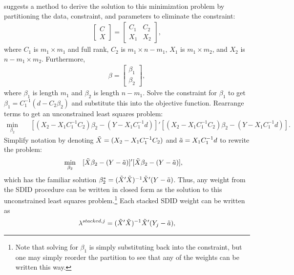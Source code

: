 \documentclass[12pt]{article}
\begin{document}
\cite{lawson1995} suggests a method to derive the solution to this minimization problem by partitioning the data, constraint, and parameters to eliminate the constraint:
\begin{align}
    \left[ \begin{array}{c}
        C \\
        X
    \end{array} \right] = 
    \left[ \begin{array}{cc}
        C_1 & C_2 \\
        X_1 & X_2
    \end{array} \right],
\end{align}
where \(C_1\) is \(m_1 \times m_1\) and full rank, \(C_2\) is \(m_1 \times n-m_1\), \(X_1\) is \(m_1 \times m_2\), and \(X_2\) is \(n-m_1 \times m_2\). Furthermore,
\begin{align}
    \beta = 
    \left[ \begin{array}{c}
        \beta_1 \\
        \beta_2
    \end{array} \right],
\end{align}
where \(\beta_1\) is length \(m_1\) and \(\beta_2\) is length \(n-m_1\).  Solve the constraint for \(\beta_1\) to get \(\beta_1 = C_1^{-1}(d-C_2\beta_2)\) and substitute this into the objective function.  Rearrange terms to get an unconstrained least squares problem:
\begin{align}
    \underset{\beta_2}{\min} & \quad [(X_2 - X_1C_1^{-1}C_2)\beta_2-(Y-X_1C_1^{-1}d)]'[(X_2 - X_1C_1^{-1}C_2)\beta_2-(Y-X_1C_1^{-1}d)].
\end{align}
Simplify notation by denoting \(\Tilde{X} = (X_2 - X_1C_1^{-1}C_2)\) and \(\Tilde{a} = X_1C_1^{-1}d\) to rewrite the problem:
\begin{align}
    \underset{\beta_2}{\min} & \quad [\Tilde{X}\beta_2-(Y-\Tilde{a})]'[\Tilde{X}\beta_2-(Y-\Tilde{a})],
\end{align}
which has the familiar solution \(\beta_2^* = (\Tilde{X}'\Tilde{X})^{-1}\Tilde{X}'(Y-\Tilde{a})\).  Thus, any weight from the SDID procedure can be written in closed form as the solution to this unconstrained least squares problem.\footnote{Note that solving for \(\beta_1\) is simply substituting back into the constraint, but one may simply reorder the partition to see that any of the weights can be written this way.}  Each stacked SDID weight can be written as
\begin{align}
    \lambda^{stacked,j} = (\Tilde{X}'\Tilde{X})^{-1}\Tilde{X}'(Y_j-\Tilde{a}),
\end{align}
\end{document}
